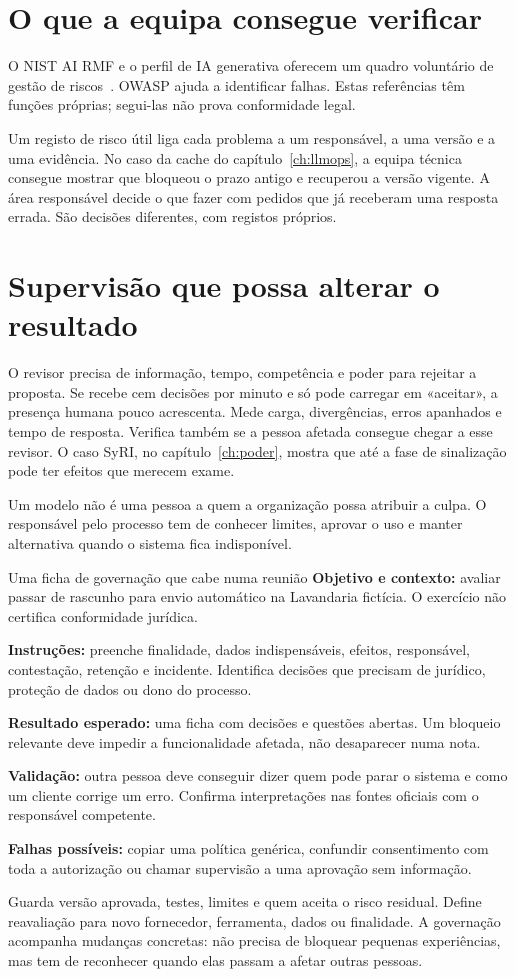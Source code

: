\section{O que a equipa consegue verificar}
O NIST AI RMF e o perfil de IA generativa oferecem um quadro voluntário de gestão de riscos~\citep{nist2024}. OWASP ajuda a identificar falhas. Estas referências têm funções próprias; segui-las não prova conformidade legal.

Um registo de risco útil liga cada problema a um responsável, a uma versão e a uma evidência. No caso da cache do capítulo~\ref{ch:llmops}, a equipa técnica consegue mostrar que bloqueou o prazo antigo e recuperou a versão vigente. A área responsável decide o que fazer com pedidos que já receberam uma resposta errada. São decisões diferentes, com registos próprios.

\section{Supervisão que possa alterar o resultado}
O revisor precisa de informação, tempo, competência e poder para rejeitar a proposta. Se recebe cem decisões por minuto e só pode carregar em «aceitar», a presença humana pouco acrescenta. Mede carga, divergências, erros apanhados e tempo de resposta. Verifica também se a pessoa afetada consegue chegar a esse revisor. O caso SyRI, no capítulo~\ref{ch:poder}, mostra que até a fase de sinalização pode ter efeitos que merecem exame.

Um modelo não é uma pessoa a quem a organização possa atribuir a culpa. O responsável pelo processo tem de conhecer limites, aprovar o uso e manter alternativa quando o sistema fica indisponível.

\begin{promptlabbox}{Uma ficha de governação que cabe numa reunião}
\textbf{Objetivo e contexto:} avaliar passar de rascunho para envio automático na Lavandaria fictícia. O exercício não certifica conformidade jurídica.

\textbf{Instruções:} preenche finalidade, dados indispensáveis, efeitos, responsável, contestação, retenção e incidente. Identifica decisões que precisam de jurídico, proteção de dados ou dono do processo.

\textbf{Resultado esperado:} uma ficha com decisões e questões abertas. Um bloqueio relevante deve impedir a funcionalidade afetada, não desaparecer numa nota.

\textbf{Validação:} outra pessoa deve conseguir dizer quem pode parar o sistema e como um cliente corrige um erro. Confirma interpretações nas fontes oficiais com o responsável competente.

\textbf{Falhas possíveis:} copiar uma política genérica, confundir consentimento com toda a autorização ou chamar supervisão a uma aprovação sem informação.
\end{promptlabbox}

Guarda versão aprovada, testes, limites e quem aceita o risco residual. Define reavaliação para novo fornecedor, ferramenta, dados ou finalidade. A governação acompanha mudanças concretas: não precisa de bloquear pequenas experiências, mas tem de reconhecer quando elas passam a afetar outras pessoas.
